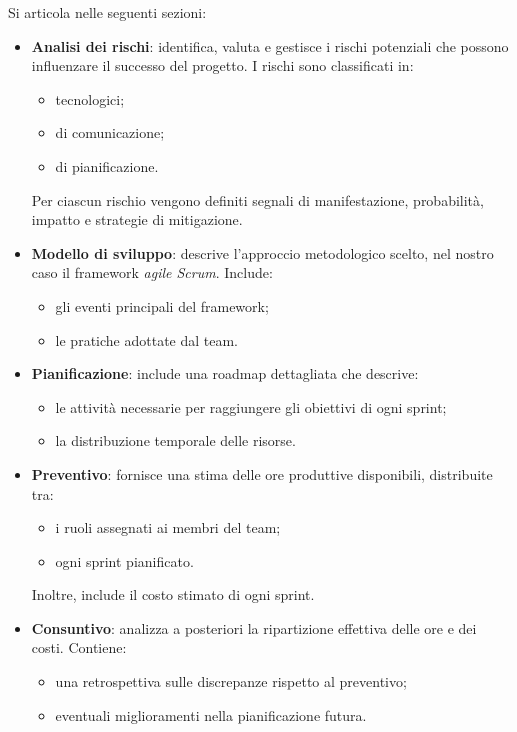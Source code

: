 Si articola nelle seguenti sezioni:
\begin{itemize}
    \item \textbf{Analisi dei rischi}: identifica, valuta e gestisce i rischi potenziali che possono influenzare il successo del progetto. I rischi sono classificati in:
    \begin{itemize}
        \item tecnologici;
        \item di comunicazione;
        \item di pianificazione.
    \end{itemize}
    Per ciascun rischio vengono definiti segnali di manifestazione, probabilità, impatto e strategie di mitigazione.

    \item \textbf{Modello di sviluppo}: descrive l’approccio metodologico scelto, nel nostro caso il framework \textit{agile Scrum}. Include:
    \begin{itemize}
        \item gli eventi principali del framework;
        \item le pratiche adottate dal team.
    \end{itemize}

    \item \textbf{Pianificazione}: include una roadmap dettagliata che descrive:
    \begin{itemize}
        \item le attività necessarie per raggiungere gli obiettivi di ogni sprint;
        \item la distribuzione temporale delle risorse.
    \end{itemize}

    \item \textbf{Preventivo}: fornisce una stima delle ore produttive disponibili, distribuite tra:
    \begin{itemize}
        \item i ruoli assegnati ai membri del team;
        \item ogni sprint pianificato.
    \end{itemize}
    Inoltre, include il costo stimato di ogni sprint.

    \item \textbf{Consuntivo}: analizza a posteriori la ripartizione effettiva delle ore e dei costi. Contiene:
    \begin{itemize}
        \item una retrospettiva sulle discrepanze rispetto al preventivo;
        \item eventuali miglioramenti nella pianificazione futura.
    \end{itemize}
\end{itemize}

